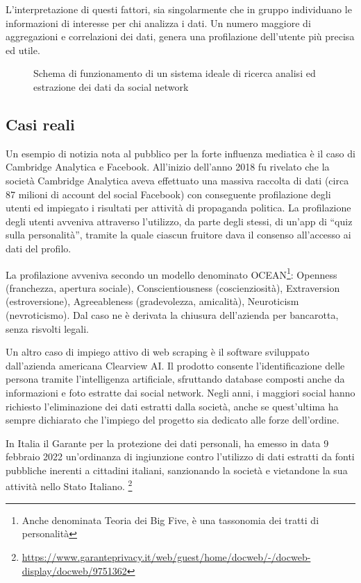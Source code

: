 L'interpretazione di questi fattori, sia singolarmente che in gruppo individuano le informazioni di interesse per chi analizza i dati. Un numero maggiore di aggregazioni e correlazioni dei dati, genera una profilazione dell'utente pi\`u precisa ed utile.
\begin{figure}[!htb]
  \begin{center}
  
  \caption{Schema di funzionamento di un sistema ideale di ricerca analisi ed estrazione dei dati da social network}
\end{center}
\end{figure}


\subsection{Casi reali} \label{casi_reali}
Un esempio di notizia nota al pubblico per la forte influenza mediatica \`e il caso di Cambridge Analytica e Facebook. All'inizio dell'anno 2018 fu rivelato che la societ\`a Cambridge Analytica aveva effettuato una massiva raccolta di dati (circa 87 milioni di account del social Facebook) con conseguente profilazione degli utenti ed impiegato i risultati per attivit\`a di propaganda politica.
La profilazione degli utenti avveniva attraverso l'utilizzo, da parte degli stessi, di un'app di ``quiz sulla personalit\`a'', tramite la quale ciascun fruitore dava il consenso all'accesso ai dati del profilo.

La profilazione avveniva secondo un modello denominato OCEAN\footnote{Anche denominata Teoria dei Big Five, \`e una tassonomia dei tratti di personalit\`a}: Openness (franchezza, apertura sociale), Conscientiousness (coscienziosit\`a), Extraversion (estroversione), Agreeableness (gradevolezza, amicalit\`a), Neuroticism (nevroticismo). 
Dal caso ne \`e derivata la chiusura dell'azienda per bancarotta, senza risvolti legali.\cite{tirino2019cambridge}

Un altro caso di impiego attivo di web scraping \`e il software sviluppato dall'azienda americana Clearview AI. Il prodotto consente l'identificazione delle persona tramite l'intelligenza artificiale, sfruttando database composti anche da informazioni e foto estratte dai social network. Negli anni, i maggiori social hanno richiesto l'eliminazione dei dati estratti dalla societ\`a, anche se quest'ultima ha sempre dichiarato che l'impiego del progetto sia dedicato alle forze dell'ordine. 

In Italia il Garante per la protezione dei dati personali, ha emesso in data 9 febbraio 2022 un'ordinanza di ingiunzione contro l'utilizzo di dati estratti da fonti pubbliche inerenti a cittadini italiani, sanzionando la societ\`a e vietandone la sua attivit\`a nello Stato Italiano. \footnote{\url{https://www.garanteprivacy.it/web/guest/home/docweb/-/docweb-display/docweb/9751362}}

